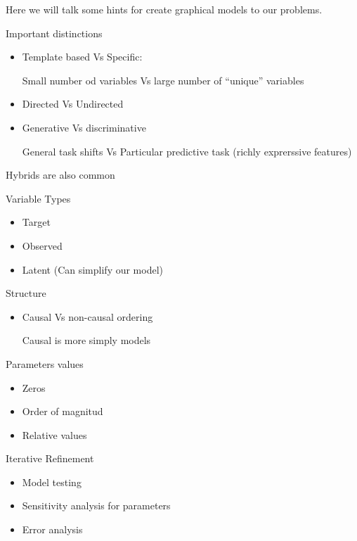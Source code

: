 
Here we will talk some hints for create graphical models to our problems.

\vspace{0.3cm}

Important distinctions

\begin{itemize}
 \item Template based Vs Specific:
 
 Small number od variables Vs large number of ``unique'' variables
 
 \item Directed Vs Undirected
 
 \item Generative Vs discriminative
 
 General task shifts Vs Particular predictive task (richly exprerssive features)
\end{itemize}

\begin{framed}
 \centering
Hybrids are also common
 \end{framed}

 \vspace{0.3cm}

Variable Types

\begin{itemize}
 \item Target
 \item Observed
 \item Latent (Can simplify our model)
\end{itemize}

\vspace{0.3cm}

Structure
\begin{itemize}
 \item Causal Vs non-causal ordering
 
 Causal is more simply models
\end{itemize}

 \vspace{0.3cm}
 
 Parameters values

\begin{itemize}
 \item Zeros
 
 \item Order of magnitud
 
 
 \item Relative values
\end{itemize}


\vspace{0.3cm}

Iterative Refinement

\begin{itemize}
 \item Model testing
 \item Sensitivity analysis for parameters
 \item Error analysis
 
\end{itemize}






